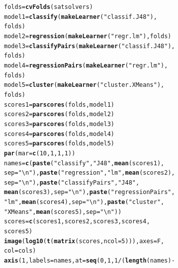 \documentclass{article}\usepackage[]{graphicx}\usepackage[]{color}
\makeatletter
\newcommand{\hlnum}[1]{\textcolor[rgb]{0.686,0.059,0.569}{#1}}%
\newcommand{\hlstr}[1]{\textcolor[rgb]{0.192,0.494,0.8}{#1}}%
\newcommand{\hlopt}[1]{\textcolor[rgb]{0,0,0}{#1}}%
\newcommand{\hlstd}[1]{\textcolor[rgb]{0.345,0.345,0.345}{#1}}%
\newcommand{\hlkwb}[1]{\textcolor[rgb]{0.69,0.353,0.396}{#1}}%
\newcommand{\hlkwc}[1]{\textcolor[rgb]{0.333,0.667,0.333}{#1}}%
\newcommand{\hlkwd}[1]{\textcolor[rgb]{0.737,0.353,0.396}{\textbf{#1}}}%
\newenvironment{kframe}{%
 \def\at@end@of@kframe{}%
 \ifinner\ifhmode%
  \def\at@end@of@kframe{\end{minipage}}%
  \begin{minipage}{\columnwidth}%
 \fi\fi%
 \def\FrameCommand##1{\hskip\@totalleftmargin \hskip-\fboxsep
 \colorbox{shadecolor}{##1}\hskip-\fboxsep
     \hskip-\linewidth \hskip-\@totalleftmargin \hskip\columnwidth}%
 \MakeFramed {\advance\hsize-\width
   \@totalleftmargin\z@ \linewidth\hsize
   \@setminipage}}%
 {\par\unskip\endMakeFramed%
 \at@end@of@kframe}
\newenvironment{knitrout}{}{} %
\makeatother
\begin{document}
\begin{knitrout}
\color{fgcolor}\begin{kframe}
\begin{alltt}
\hlstd{folds} \hlkwb{=} \hlkwd{cvFolds}\hlstd{(satsolvers)}
\hlstd{model1} \hlkwb{=} \hlkwd{classify}\hlstd{(}\hlkwd{makeLearner}\hlstd{(}\hlstr{"classif.J48"}\hlstd{),}
    \hlstd{folds)}
\hlstd{model2} \hlkwb{=} \hlkwd{regression}\hlstd{(}\hlkwd{makeLearner}\hlstd{(}\hlstr{"regr.lm"}\hlstd{), folds)}
\hlstd{model3} \hlkwb{=} \hlkwd{classifyPairs}\hlstd{(}\hlkwd{makeLearner}\hlstd{(}\hlstr{"classif.J48"}\hlstd{),}
    \hlstd{folds)}
\hlstd{model4} \hlkwb{=} \hlkwd{regressionPairs}\hlstd{(}\hlkwd{makeLearner}\hlstd{(}\hlstr{"regr.lm"}\hlstd{),}
    \hlstd{folds)}
\hlstd{model5} \hlkwb{=} \hlkwd{cluster}\hlstd{(}\hlkwd{makeLearner}\hlstd{(}\hlstr{"cluster.XMeans"}\hlstd{),}
    \hlstd{folds)}
\hlstd{scores1} \hlkwb{=} \hlkwd{parscores}\hlstd{(folds, model1)}
\hlstd{scores2} \hlkwb{=} \hlkwd{parscores}\hlstd{(folds, model2)}
\hlstd{scores3} \hlkwb{=} \hlkwd{parscores}\hlstd{(folds, model3)}
\hlstd{scores4} \hlkwb{=} \hlkwd{parscores}\hlstd{(folds, model4)}
\hlstd{scores5} \hlkwb{=} \hlkwd{parscores}\hlstd{(folds, model5)}
\hlkwd{par}\hlstd{(}\hlkwc{mar} \hlstd{=} \hlkwd{c}\hlstd{(}\hlnum{10}\hlstd{,} \hlnum{1}\hlstd{,} \hlnum{1}\hlstd{,} \hlnum{1}\hlstd{))}
\hlstd{names} \hlkwb{=} \hlkwd{c}\hlstd{(}\hlkwd{paste}\hlstd{(}\hlstr{"classify"}\hlstd{,} \hlstr{"J48"}\hlstd{,} \hlkwd{mean}\hlstd{(scores1),}
    \hlkwc{sep} \hlstd{=} \hlstr{"\textbackslash{}n"}\hlstd{),} \hlkwd{paste}\hlstd{(}\hlstr{"regression"}\hlstd{,} \hlstr{"lm"}\hlstd{,} \hlkwd{mean}\hlstd{(scores2),}
    \hlkwc{sep} \hlstd{=} \hlstr{"\textbackslash{}n"}\hlstd{),} \hlkwd{paste}\hlstd{(}\hlstr{"classifyPairs"}\hlstd{,} \hlstr{"J48"}\hlstd{,}
    \hlkwd{mean}\hlstd{(scores3),} \hlkwc{sep} \hlstd{=} \hlstr{"\textbackslash{}n"}\hlstd{),} \hlkwd{paste}\hlstd{(}\hlstr{"regressionPairs"}\hlstd{,}
    \hlstr{"lm"}\hlstd{,} \hlkwd{mean}\hlstd{(scores4),} \hlkwc{sep} \hlstd{=} \hlstr{"\textbackslash{}n"}\hlstd{),} \hlkwd{paste}\hlstd{(}\hlstr{"cluster"}\hlstd{,}
    \hlstr{"XMeans"}\hlstd{,} \hlkwd{mean}\hlstd{(scores5),} \hlkwc{sep} \hlstd{=} \hlstr{"\textbackslash{}n"}\hlstd{))}
\hlstd{scores} \hlkwb{=} \hlkwd{c}\hlstd{(scores1, scores2, scores3, scores4,}
    \hlstd{scores5)}
\hlkwd{image}\hlstd{(}\hlkwd{log10}\hlstd{(}\hlkwd{t}\hlstd{(}\hlkwd{matrix}\hlstd{(scores,} \hlkwc{ncol} \hlstd{=} \hlnum{5}\hlstd{))),} \hlkwc{axes} \hlstd{= F,}
    \hlkwc{col} \hlstd{= cols)}
\hlkwd{axis}\hlstd{(}\hlnum{1}\hlstd{,} \hlkwc{labels} \hlstd{= names,} \hlkwc{at} \hlstd{=} \hlkwd{seq}\hlstd{(}\hlnum{0}\hlstd{,} \hlnum{1}\hlstd{,} \hlnum{1}\hlopt{/}\hlstd{(}\hlkwd{length}\hlstd{(names)} \hlopt{-}

\end{alltt}
\end{kframe}
\end{knitrout}
\end{document}

